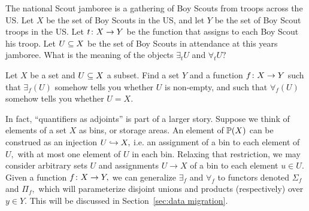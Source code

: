 \documentclass[../main/CT4S-EN-RU]{subfiles}
\begin{document}
\begin{exampleRUS}
\end{exampleRUS}

\begin{exerciseENG}
The national Scout jamboree is a gathering of Boy Scouts from troops across the US. Let $X$ be the set of Boy Scouts in the US, and let $Y$ be the set of Boy Scout troops in the US. Let $t\taking X\to Y$ be the function that assigns to each Boy Scout his troop. Let $U\ss X$ be the set of Boy Scouts in attendance at this years jamboree. What is the meaning of the objects $\exists_tU$ and $\forall_tU?$
\end{exerciseENG}

\begin{exerciseRUS}
\end{exerciseRUS}

\begin{exerciseENG}
Let $X$ be a set and $U\ss X$ a subset. Find a set $Y$ and a function $f\taking X\to Y$ such that $\exists_f(U)$ somehow tells you whether $U$ is non-empty, and such that $\forall_f(U)$ somehow tells you whether $U=X.$
\end{exerciseENG}

\begin{exerciseRUS}
\end{exerciseRUS}

\begin{blockENG}
In fact, “quantifiers as adjoints” is part of a larger story. Suppose we think of elements of a set $X$ as bins, or storage areas. An element of $\PP(X)$ can be construed as an injection $U\inj X,$ i.e. an assignment of a bin to each element of $U,$ with at most one element of $U$ in each bin. Relaxing that restriction, we may consider arbitrary sets $U$ and assignments $U\to X$ of a bin to each element $u\in U.$ Given a function $f\taking X\to Y,$ we can generalize $\exists_f$ and $\forall_f$ to functors denoted $\Sigma_f$ and $\Pi_f,$ which will parameterize disjoint unions and products (respectively) over $y\in Y.$ This will be discussed in Section~\ref{sec:data migration}.
\end{blockENG}

\begin{blockRUS}
\end{blockRUS}


\subsection{}\label{sec:universal concepts}
\end{document}
